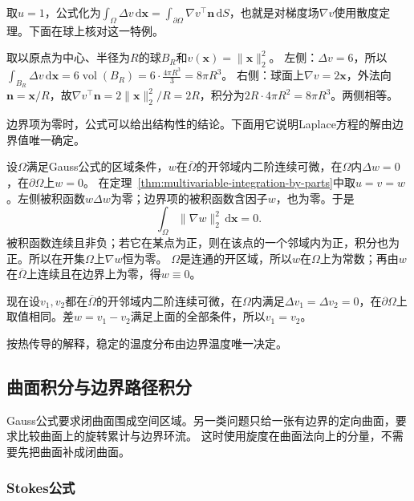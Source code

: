 取$u=1$，公式化为$\int_\Omega\Delta v\,\mathrm d\bm x=\int_{\partial\Omega}\nabla v^\top\bm n\,\mathrm dS$，也就是对梯度场$\nabla v$使用散度定理。下面在球上核对这一特例。
\begin{example}[球上平方范数的Laplace积分]
取以原点为中心、半径为$R$的球$B_R$和$v(\bm x)=\lVert\bm x\rVert_2^2$。
左侧：$\Delta v=6$，所以$\int_{B_R}\Delta v\,\mathrm d\bm x=6\operatorname{vol}(B_R)=6\cdot\frac{4\pi R^3}3=8\pi R^3$。
右侧：球面上$\nabla v=2\bm x$，外法向$\bm n=\bm x/R$，故$\nabla v^\top\bm n=2\lVert\bm x\rVert_2^2/R=2R$，积分为$2R\cdot4\pi R^2=8\pi R^3$。两侧相等。
\end{example}

边界项为零时，公式可以给出结构性的结论。下面用它说明Laplace方程的解由边界值唯一确定。
\begin{example}[Laplace方程的解由边界值决定]
设$\Omega$满足Gauss公式的区域条件，$w$在$\overline\Omega$的开邻域内二阶连续可微，在$\Omega$内$\Delta w=0$，在$\partial\Omega$上$w=0$。
在定理~\ref{thm:multivariable-integration-by-parts}中取$u=v=w$。左侧被积函数$w\Delta w$为零；边界项的被积函数含因子$w$，也为零。于是
\[
 \int_\Omega\lVert\nabla w\rVert_2^2\,\mathrm d\bm x=0.
\]
被积函数连续且非负；若它在某点为正，则在该点的一个邻域内为正，积分也为正。所以在开集$\Omega$上$\nabla w$恒为零。
$\Omega$是连通的开区域，所以$w$在$\Omega$上为常数；再由$w$在$\overline\Omega$上连续且在边界上为零，得$w\equiv0$。

现在设$v_1,v_2$都在$\overline\Omega$的开邻域内二阶连续可微，在$\Omega$内满足$\Delta v_1=\Delta v_2=0$，在$\partial\Omega$上取值相同。差$w=v_1-v_2$满足上面的全部条件，所以$v_1=v_2$。
\end{example}
按热传导的解释，稳定的温度分布由边界温度唯一决定。

\subsection{曲面积分与边界路径积分}

Gauss公式要求闭曲面围成空间区域。另一类问题只给一张有边界的定向曲面，要求比较曲面上的旋转累计与边界环流。
这时使用旋度在曲面法向上的分量，不需要先把曲面补成闭曲面。

\subsubsection{Stokes公式}

